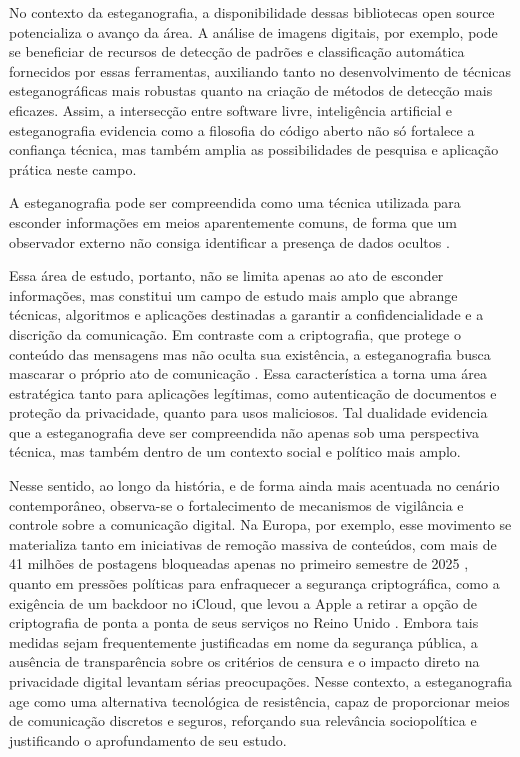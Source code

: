 \documentclass[12pt]{article}
\begin{document}
No contexto da esteganografia, a disponibilidade dessas bibliotecas open source
potencializa o avanço da área. A análise de imagens digitais, por exemplo, pode
se beneficiar de recursos de detecção de padrões e classificação automática
fornecidos por essas ferramentas, auxiliando tanto no desenvolvimento
de técnicas esteganográficas mais robustas quanto na criação de métodos de
detecção mais eficazes. Assim, a intersecção entre software livre, inteligência
artificial e esteganografia evidencia como a filosofia do código aberto não só
fortalece a confiança técnica, mas também amplia as possibilidades de pesquisa
e aplicação prática neste campo.

A esteganografia pode ser compreendida como uma técnica utilizada para esconder
informações em meios aparentemente comuns, de forma que um observador externo
não consiga identificar a presença de dados ocultos \cite{Fridrich2010}.

Essa área de estudo, portanto, não se limita apenas ao ato de esconder
informações, mas constitui um campo de estudo mais amplo que abrange técnicas,
algoritmos e aplicações destinadas a garantir a confidencialidade e a discrição
da comunicação. Em contraste com a criptografia, que protege o conteúdo das
mensagens mas não oculta sua existência, a esteganografia busca mascarar o
próprio ato de comunicação \cite{Fridrich2010}. Essa característica a torna uma
área estratégica tanto para aplicações legítimas, como autenticação de
documentos e proteção da privacidade, quanto para usos maliciosos. Tal
dualidade evidencia que a esteganografia deve ser compreendida não apenas sob
uma perspectiva técnica, mas também dentro de um contexto social e político
mais amplo.

Nesse sentido, ao longo da história, e de forma ainda mais acentuada no cenário
contemporâneo, observa-se o fortalecimento de mecanismos de vigilância e
controle sobre a comunicação digital. Na Europa, por exemplo, esse movimento se
materializa tanto em iniciativas de remoção massiva de conteúdos, com mais de
41 milhões de postagens bloqueadas apenas no primeiro semestre de 2025
\cite{poder3602025}, quanto em pressões políticas para enfraquecer a segurança
criptográfica, como a exigência de um backdoor no iCloud, que levou a Apple a
retirar a opção de criptografia de ponta a ponta de seus serviços no Reino
Unido \cite{guardian2025}. Embora tais medidas sejam frequentemente
justificadas em nome da segurança pública, a ausência de transparência sobre os
critérios de censura e o impacto direto na privacidade digital levantam sérias
preocupações. Nesse contexto, a esteganografia age como uma alternativa
tecnológica de resistência, capaz de proporcionar meios de comunicação
discretos e seguros, reforçando sua relevância sociopolítica e justificando o
aprofundamento de seu estudo.
\end{document}
